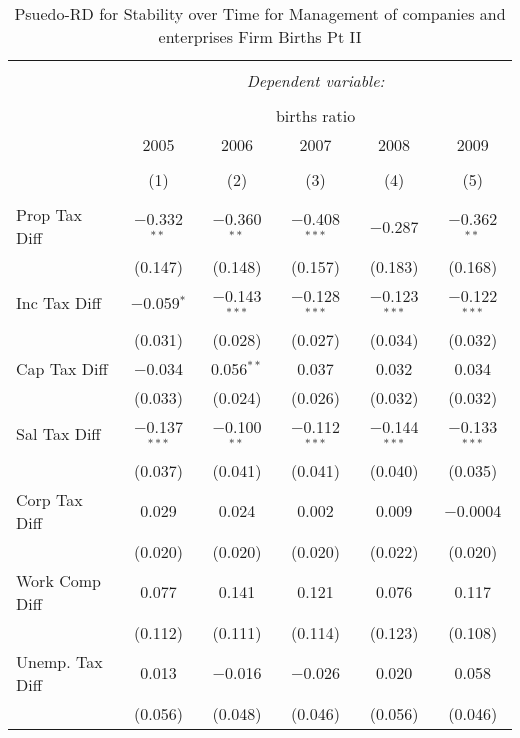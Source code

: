 
\begin{table}[!htbp] \centering 
  \caption{Psuedo-RD for Stability over Time for  Management of companies and enterprises Firm Births Pt II} 
  \label{55year} 
\small 
\begin{tabular}{@{\extracolsep{5pt}}lccccc} 
\\[-1.8ex]\hline 
\hline \\[-1.8ex] 
 & \multicolumn{5}{c}{\textit{Dependent variable:}} \\ 
\cline{2-6} 
\\[-1.8ex] & \multicolumn{5}{c}{births ratio} \\ 
 & 2005 & 2006 & 2007 & 2008 & 2009 \\ 
\\[-1.8ex] & (1) & (2) & (3) & (4) & (5)\\ 
\hline \\[-1.8ex] 
 Prop Tax Diff & $-$0.332$^{**}$ & $-$0.360$^{**}$ & $-$0.408$^{***}$ & $-$0.287 & $-$0.362$^{**}$ \\ 
  & (0.147) & (0.148) & (0.157) & (0.183) & (0.168) \\ 
  Inc Tax Diff & $-$0.059$^{*}$ & $-$0.143$^{***}$ & $-$0.128$^{***}$ & $-$0.123$^{***}$ & $-$0.122$^{***}$ \\ 
  & (0.031) & (0.028) & (0.027) & (0.034) & (0.032) \\ 
  Cap Tax Diff & $-$0.034 & 0.056$^{**}$ & 0.037 & 0.032 & 0.034 \\ 
  & (0.033) & (0.024) & (0.026) & (0.032) & (0.032) \\ 
  Sal Tax Diff & $-$0.137$^{***}$ & $-$0.100$^{**}$ & $-$0.112$^{***}$ & $-$0.144$^{***}$ & $-$0.133$^{***}$ \\ 
  & (0.037) & (0.041) & (0.041) & (0.040) & (0.035) \\ 
  Corp Tax Diff & 0.029 & 0.024 & 0.002 & 0.009 & $-$0.0004 \\ 
  & (0.020) & (0.020) & (0.020) & (0.022) & (0.020) \\ 
  Work Comp Diff & 0.077 & 0.141 & 0.121 & 0.076 & 0.117 \\ 
  & (0.112) & (0.111) & (0.114) & (0.123) & (0.108) \\ 
  Unemp. Tax Diff & 0.013 & $-$0.016 & $-$0.026 & 0.020 & 0.058 \\ 
  & (0.056) & (0.048) & (0.046) & (0.056) & (0.046) \\ 

\end{tabular}
\end{table}
